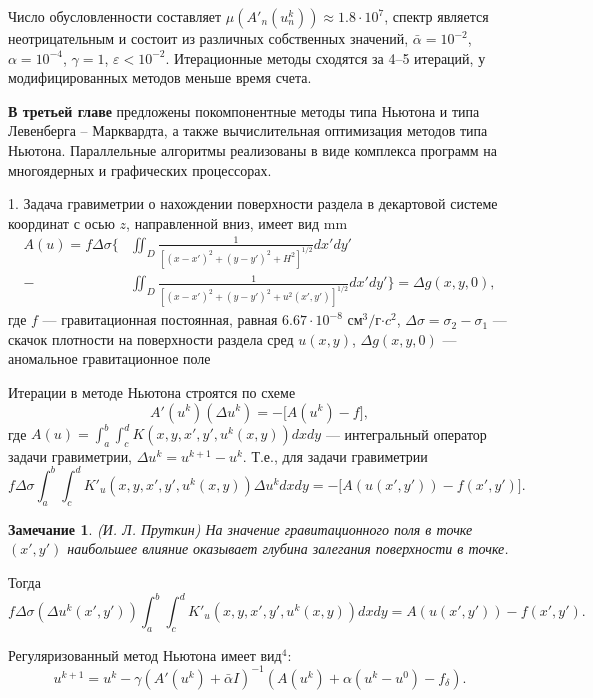 \documentclass[%
autoref,     %
href,        %
facsimile,   %
colorlinks,  %
]{disser}
\newtheorem{remark}{Замечание}
\begin{document}
Число обусловленности составляет $\mu(A'_n(u_n^k))\approx 1.8\cdot 10^7$, спектр является неотрицательным и состоит из различных собственных значений, $\bar\alpha=10^{-2}$, $\alpha = 10^{-4}$, $\gamma=1$, $\varepsilon < 10^{-2}$. Итерационные методы сходятся за 4--5 итераций, у модифицированных методов меньше время счета.


\textbf{В третьей главе} предложены покомпонентные методы типа Ньютона и типа Левенберга -- Марквардта, а также вычислительная оптимизация методов типа Ньютона. Параллельные алгоритмы реализованы в виде комплекса программ на многоядерных и графических процессорах.

1. Задача гравиметрии о нахождении поверхности раздела в декартовой системе координат с осью $z$, направленной вниз, имеет вид
 mm
\begin{equation}\label{equ_grav_2l}
\begin{aligned}
A(u)=f\Delta\sigma \bigg\{ &\iint_{D} \frac{1}{[(x-x')^2+(y-y')^2+H^2]^{1/2}}dx'dy' \\
- &\iint_{D} \frac{1}{[(x-x')^2+(y-y')^2+u^2(x',y')]^{1/2}}dx'dy'\bigg\}=\Delta g(x,y,0),
\end{aligned} 
\end{equation}
	где $f$ --- гравитационная постоянная, равная $6.67\cdot10^{-8}$ см$^3/$г$\cdot c^2$, $\Delta\sigma=\sigma_2-\sigma_1$ --- скачок плотности на поверхности раздела сред $u(x,y)$, $\Delta g(x,y,0)$ --- аномальное гравитационное поле%
	
	Итерации в методе Ньютона строятся по схеме
$$A'(u^k)(\Delta u^k)=-\big[A(u^k)-f\big],$$ где $A(u)=\int_{a}^{b}\int_{c}^{d}K(x,y, x',y',u^k(x,y))dxdy$ --- интегральный оператор задачи гравиметрии, $\Delta u^k=u^{k+1}-u^k$.
Т.е., для задачи гравиметрии
$$f\Delta\sigma\int_{a}^{b}\int_{c}^{d}K'_u(x,y, x',y',u^k(x,y))\Delta u^k dxdy=-\big[A(u(x',y'))-f(x',y')\big].$$
\begin{remark} (И. Л. Пруткин)
	На значение гравитационного поля в точке $(x',y')$ наибольшее влияние оказывает глубина залегания поверхности в точке.
\end{remark}  
Тогда
$$f\Delta\sigma(\Delta u^k(x',y'))\int_{a}^{b}\int_{c}^{d}K'_u(x,y, x',y',u^k(x,y)) dxdy=A(u(x',y'))-f(x',y').$$

Регуляризованный метод Ньютона имеет вид$^4$:
$$ u^{k+1}=u^k-\gamma(A'(u^k)+\bar\alpha I)^{-1}(A(u^k)+\alpha(u^k-u^0)-f_\delta).$$
\end{document}
